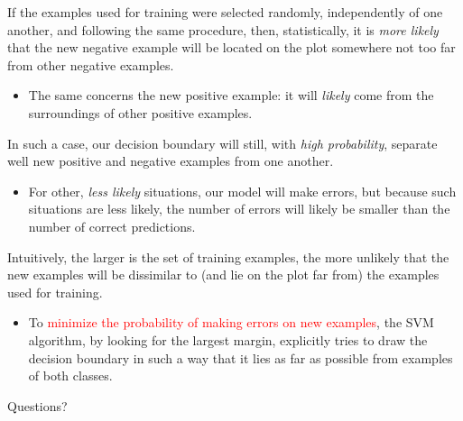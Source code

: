 \documentclass[10pt,dvipsnames]{beamer}
\begin{document}
\begin{frame}
    If the examples used for training were selected randomly, independently of one another, and following the same procedure, then, statistically, it is \textit{more likely} that the new negative example will be located on the plot somewhere not too far from other negative examples.
    \begin{itemize}
        \item The same concerns the new positive example: it will \textit{likely} come from the surroundings of other positive examples.
    \end{itemize}
    In such a case, our decision boundary will still, with \textit{high probability}, separate well new positive and negative examples from one another.
    \begin{itemize}
        \item For other, \textit{less likely} situations, our model will make errors, but because such situations are less likely, the number of errors will likely be smaller than the number of correct predictions.
    \end{itemize}
    Intuitively, the larger is the set of training examples, the more unlikely that the new examples will be dissimilar to (and lie on the plot far from) the examples used for training.
    \begin{itemize}
        \item To \textcolor{red}{minimize the probability of making errors on new examples}, the SVM algorithm, by looking for the largest margin, explicitly tries to draw the decision boundary in such a way that it lies as far as possible from examples of both classes.
    \end{itemize}
\end{frame}

\begin{frame}
    \begin{center}
        \Huge Questions?
    \end{center}
\end{frame}
\end{document}
